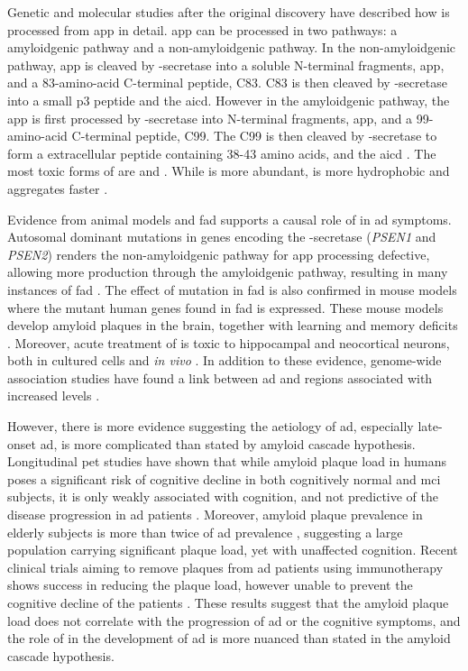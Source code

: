 Genetic and molecular studies after the original discovery have described how \abeta{} is processed from \gls{app} in detail. \Gls{app} can be processed in two pathways: a amyloidgenic pathway and a non-amyloidgenic pathway. In the non-amyloidgenic pathway, \gls{app} is cleaved by \textalpha-secretase into a soluble N-terminal fragments, \gls{app}\textalpha, and a 83-amino-acid C-terminal peptide, C83. C83 is then cleaved by \textgamma-secretase into a small p3 peptide and the \gls{aicd}. However in the amyloidgenic pathway, the \gls{app} is first processed by \textbeta-secretase into N-terminal fragments, \gls{app}\textbeta, and a 99-amino-acid C-terminal peptide, C99. The C99 is then cleaved by \textgamma-secretase to form a extracellular peptide containing 38-43 amino acids, \abeta{} and the \gls{aicd} \citep{barage15}. The most toxic forms of \abeta{} are \abeta[40] and \abeta[42]. While \abeta[40] is more abundant, \abeta[42] is more hydrophobic and aggregates faster \citep{walsh07}. 

Evidence from animal models and \gls{fad} supports a causal role of \abeta{} in \gls{ad} symptoms. Autosomal dominant mutations in genes encoding the \textgamma-secretase (\textit{PSEN1} and \textit{PSEN2}) renders the non-amyloidgenic pathway for \gls{app} processing defective, allowing more \abeta{} production through the amyloidgenic pathway, resulting in many instances of \gls{fad} \citep{suzuki94, levy-lahad95, rogaev95}. The effect of mutation in \gls{fad} is also confirmed in mouse models where the mutant human genes found in \gls{fad} is expressed. These mouse models develop amyloid plaques in the brain, together with learning and memory deficits \citep{hsiao96, dodart99, chishti01, westerman02}. Moreover, acute treatment of \abeta{} is toxic to hippocampal and neocortical neurons, both in cultured cells and \textit{in vivo} \citep{lacor04, shankar08}. In addition to these evidence, genome-wide association studies have found a link between \gls{ad} and regions associated with increased \abeta{} levels \citep{kehoe99, myers00}.

However, there is more evidence suggesting the aetiology of \gls{ad}, especially late-onset \gls{ad}, is more complicated than stated by amyloid cascade hypothesis. Longitudinal \gls{pet} studies have shown that while amyloid plaque load in humans poses a significant risk of cognitive decline in both cognitively normal and \gls{mci} subjects, it is only weakly associated with cognition, and not predictive of the disease progression in \gls{ad} patients \citep{chen14}. Moreover, amyloid plaque prevalence in elderly subjects is more than twice of \gls{ad} prevalence \citep{rowe10, ad16}, suggesting a large population carrying significant plaque load, yet with unaffected cognition. Recent clinical trials aiming to remove plaques from \gls{ad} patients using immunotherapy shows success in reducing the plaque load, however unable to prevent the cognitive decline of the patients \citep{farlow15, siemers16, sevigny16}. These results suggest that the amyloid plaque load does not correlate with the progression of \gls{ad} or the cognitive symptoms, and the role of \abeta{} in the development of \gls{ad} is more nuanced than stated in the amyloid cascade hypothesis. 

